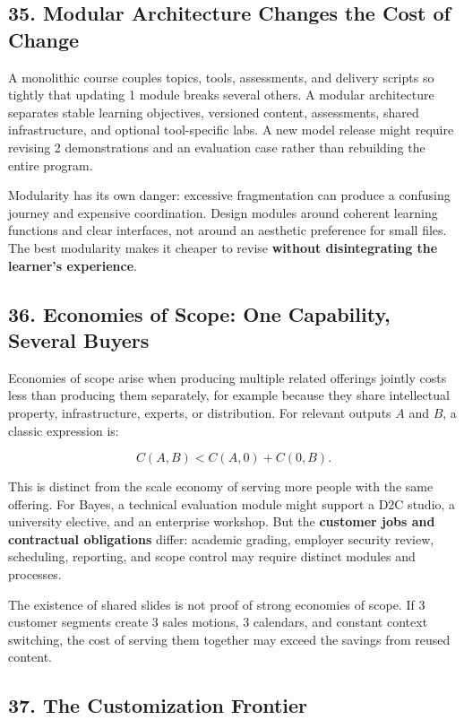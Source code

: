 \subsection*{35. Modular Architecture Changes the Cost of Change}

A monolithic course couples topics, tools, assessments, and delivery scripts so tightly that updating 1 module breaks several others. A modular architecture separates stable learning objectives, versioned content, assessments, shared infrastructure, and optional tool-specific labs. A new model release might require revising 2 demonstrations and an evaluation case rather than rebuilding the entire program.

Modularity has its own danger: excessive fragmentation can produce a confusing journey and expensive coordination. Design modules around coherent learning functions and clear interfaces, not around an aesthetic preference for small files. The best modularity makes it cheaper to revise \textbf{without disintegrating the learner's experience}.

\subsection*{36. Economies of Scope: One Capability, Several Buyers}

Economies of scope arise when producing multiple related offerings jointly costs less than producing them separately, for example because they share intellectual property, infrastructure, experts, or distribution. For relevant outputs $A$ and $B$, a classic expression is:

\begin{equation}
C(A,B) < C(A,0) + C(0,B).
\end{equation}

This is distinct from the scale economy of serving more people with the same offering. For Bayes, a technical evaluation module might support a D2C studio, a university elective, and an enterprise workshop. But the \textbf{customer jobs and contractual obligations} differ: academic grading, employer security review, scheduling, reporting, and scope control may require distinct modules and processes.

The existence of shared slides is not proof of strong economies of scope. If 3 customer segments create 3 sales motions, 3 calendars, and constant context switching, the cost of serving them together may exceed the savings from reused content.

\subsection*{37. The Customization Frontier}

